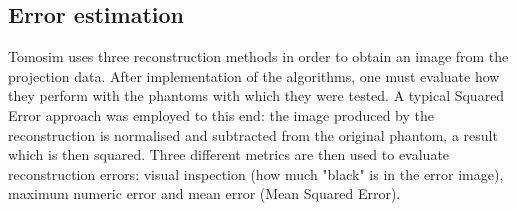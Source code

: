 \subsection{Error estimation}%
\label{sub:error_estimation}

Tomosim uses three reconstruction methods in order to obtain an image
from the projection data. After implementation of the algorithms, one
must evaluate how they perform with the phantoms with which they were
tested. A typical Squared Error approach was employed to this end:
the image produced by the reconstruction is normalised and subtracted
from the original phantom, a result which is then squared. Three
different metrics are then used to evaluate reconstruction errors:
visual inspection (how much "black" is in the error image), maximum
numeric error and mean error (Mean Squared Error).
